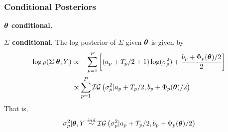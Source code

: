 \documentclass[12pt]{article}
\begin{document}
\subsubsection{Conditional Posteriors}

\bigskip
\noindent
\textbf{$\boldsymbol{\theta}$ conditional.}

\bigskip
\noindent
\textbf{$\Sigma$ conditional.}
The log posterior of $\Sigma$ given $\boldsymbol{\theta}$ is given by 
\begin{align*}
\log p(\Sigma|\boldsymbol{\theta}, Y) &\propto -\sum_{p = 1}^{P} \left[\left(a_p + T_{p}/2 + 1 \right)\log(\sigma_p^2) + \frac{b_p + \Phi_p(\boldsymbol{\theta})/2}{2} \right] \\
				      &\propto \sum_{p = 1}^{P} \mathcal{IG}\left(\sigma_p^2|a_p + T_{p}/2, b_p + \Phi_p(\boldsymbol{\theta})/2 \right)
\end{align*}
That is, 
\begin{align*}
\sigma_p^2|\boldsymbol{\theta}, Y \overset{ind}{\sim} \mathcal{IG}\left(\sigma_p^2|a_p + T_{p}/2, b_p + \Phi_p(\boldsymbol{\theta})/2 \right)
\end{align*}

\end{document}
